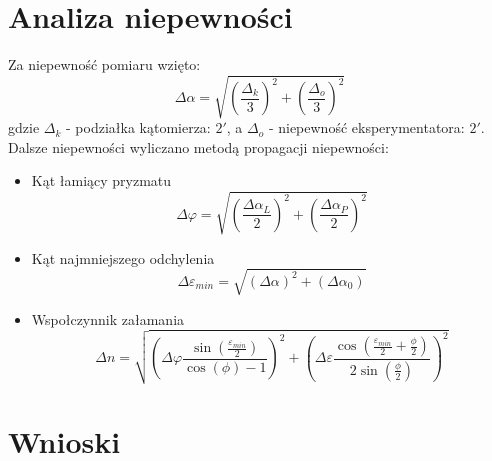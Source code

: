 \documentclass[a4paper,10pt]{article}
\begin{document}
\section{Analiza niepewności}
Za niepewność pomiaru wzięto:
\begin{equation}
  \Delta \alpha = \sqrt{(\frac{\Delta_k}{3})^2+(\frac{\Delta_o}{3})^2}
\end{equation}
gdzie $\Delta_k$ - podziałka kątomierza: $2'$, a $\Delta_o$ - niepewność eksperymentatora: $2'$.\\
Dalsze niepewności wyliczano metodą propagacji niepewności:
\begin{itemize}
  \item Kąt łamiący pryzmatu
  \begin{equation}
    \Delta \varphi = \sqrt{(\frac{\Delta \alpha_L}{2})^2+(\frac{\Delta \alpha_P}{2})^2}
  \end{equation}
  \item Kąt najmniejszego odchylenia
  \begin{equation}
    \Delta \varepsilon_{min} = \sqrt{(\Delta \alpha)^2+(\Delta \alpha_0)}
  \end{equation}
  \item Wspołczynnik załamania
  \begin{equation}
    \Delta n = \sqrt{(\Delta \varphi \frac{\sin{\left (\frac{\varepsilon_{min}}{2} \right )}}{\cos{\left (\phi \right )} - 1})^2+
    (\Delta \varepsilon \frac{\cos{\left (\frac{\varepsilon_{min}}{2} + \frac{\phi}{2} \right )}}{2 \sin{\left (\frac{\phi}{2} \right )}})^2}
  \end{equation}
\end{itemize}

\section{Wnioski}
\end{document}
